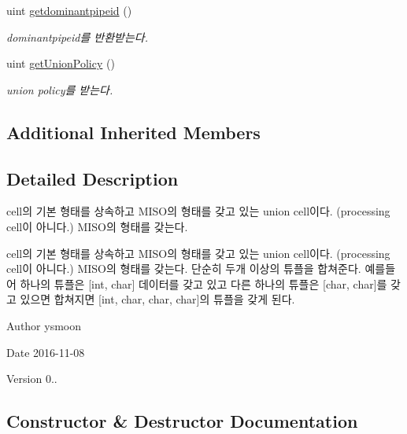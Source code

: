 \begin{DoxyCompactItemize}
uint \hyperlink{classUNIONCELL_abb9d6890717720d1472a97a8122beee1}{getdominantpipeid} ()
\begin{DoxyCompactList}\small\item\em dominantpipeid를 반환받는다. \end{DoxyCompactList}\item 
uint \hyperlink{classUNIONCELL_aac0488cf7d003881e4cfa45ce2055e36}{get\+Union\+Policy} ()
\begin{DoxyCompactList}\small\item\em union policy를 받는다. \end{DoxyCompactList}\end{DoxyCompactItemize}
\subsection*{Additional Inherited Members}


\subsection{Detailed Description}
cell의 기본 형태를 상속하고 M\+I\+S\+O의 형태를 갖고 있는 union cell이다. (processing cell이 아니다.) M\+I\+S\+O의 형태를 갖는다. 

cell의 기본 형태를 상속하고 M\+I\+S\+O의 형태를 갖고 있는 union cell이다. (processing cell이 아니다.) M\+I\+S\+O의 형태를 갖는다. 단순히 두개 이상의 튜플을 합쳐준다. 예를들어 하나의 튜플은 \mbox{[}int, char\mbox{]} 데이터를 갖고 있고 다른 하나의 튜플은 \mbox{[}char, char\mbox{]}를 갖고 있으면 합쳐지면 \mbox{[}int, char, char, char\mbox{]}의 튜플을 갖게 된다. \begin{DoxyAuthor}{Author}
ysmoon 
\end{DoxyAuthor}
\begin{DoxyDate}{Date}
2016-\/11-\/08 
\end{DoxyDate}
\begin{DoxyVersion}{Version}
0.. 
\end{DoxyVersion}


\subsection{Constructor \& Destructor Documentation}
\hypertarget{classUNIONCELL_ad0a662c44a37238e6f948d2481a0438a}{}
